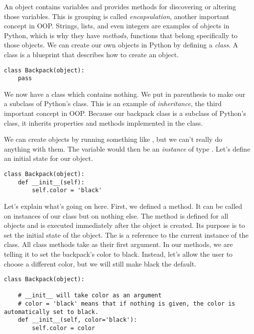 An object contains variables and provides methods for discovering or altering those variables.
This is grouping is called \emph{encapsulation}, another important concept in OOP.
Strings, lists, and even integers are examples of objects in Python, which is why they have \emph{methods}, functions that belong specifically to those objects.
We can create our own objects in Python by defining a \emph{class}.
A class is a blueprint that describes how to create an object.

\begin{lstlisting}
class Backpack(object):
    pass
\end{lstlisting}

We now have a class  which contains nothing.
We put  in parenthesis to make our  a subclass of Python's  class.
This is an example of \emph{inheritance}, the third important concept in OOP.
Because our backpack class is a subclass of Python's  class, it inherits properties and methods implemented in the  class.

We can create  objects by running something like , but we can't really do anything with them.
The variable  would then be an \emph{instance} of type .
Let's define an initial state for our object.

\begin{lstlisting}
class Backpack(object):
    def __init__(self):
        self.color = 'black'
\end{lstlisting}

Let's explain what's going on here.
First, we defined a method.
It can be called on instances of our class but on nothing else.
The  method is defined for all objects and is executed immediately after the object is created.
Its purpose is to set the initial state of the object.
The  is a reference to the current instance of the class.
All class methods take  as their first argument.
In our  methods, we are telling it to set the backpack's color to black.
Instead, let's allow the user to choose a different color, but we will still make black the default.

\begin{lstlisting}
class Backpack(object):

    # __init__ will take color as an argument
    # color = 'black' means that if nothing is given, the color is automatically set to black.
    def __init__(self, color='black'): 
        self.color = color
\end{lstlisting}

